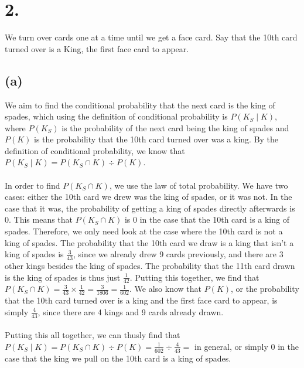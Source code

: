 \documentclass{article}
\begin{document}
\section*{2.}
{\Large
We turn over cards one at a time until we get a face card. Say that the 10th card turned over is a King, the first face card to appear.

\subsection*{(a)}
We aim to find the conditional probability that the next card is the king of spades, which using the definition of conditional probability is $P(K_S \mid K)$, where $P(K_S)$ is the probability of the next card being the king of spades and $P(K)$ is the probability that the 10th card turned over was a king. By the definition of conditional probability, we know that $P(K_S \mid K) = P(K_S \cap K) \div P(K)$. \\ \\
In order to find $P(K_S \cap K)$, we use the law of total probability. We have two cases: either the 10th card we drew was the king of spades, or it was not. In the case that it was, the probability of getting a king of spades directly afterwards is 0. This means that $P(K_S \cap K)$ is 0 in the case that the 10th card is a king of spades. Therefore, we only need look at the case where the 10th card is not a king of spades. The probability that the 10th card we draw is a king that isn't a king of spades is $\frac{3}{43}$, since we already drew 9 cards previously, and there are 3 other kings besides the king of spades. The probability that the 11th card drawn is the king of spades is thus just $\frac{1}{42}$. Putting this together, we find that $P(K_S \cap K) = \frac{3}{43} \times \frac{1}{42} = \frac{3}{1806} = \frac{1}{602}$. We also know that $P(K)$, or the probability that the 10th card turned over is a king and the first face card to appear, is simply $\frac{4}{43}$, since there are 4 kings and 9 cards already drawn. \\ \\
Putting this all together, we can thusly find that $P(K_S \mid K) = P(K_S \cap K) \div P(K) = \frac{1}{602} \div \frac{4}{43} = $  in general, or simply 0 in the case that the king we pull on the 10th card is a king of spades.

}
\end{document}
